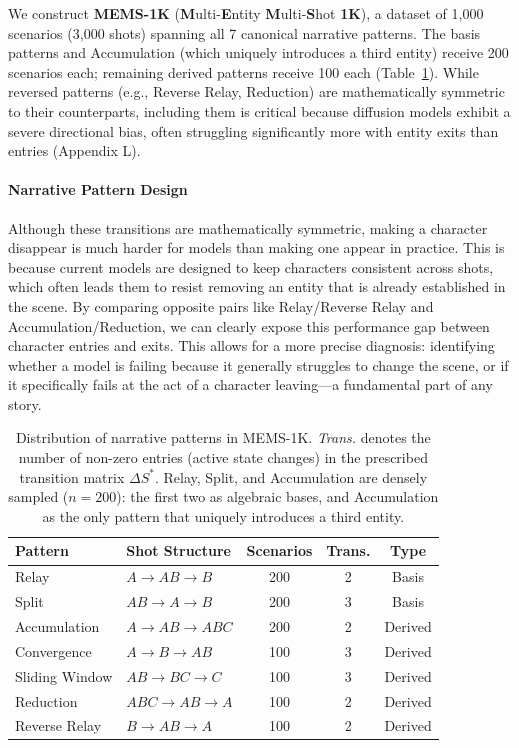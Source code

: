 \documentclass[sigconf,review,anonymous]{acmart}
\theoremstyle{definition}
\begin{document}
We construct \textbf{MEMS-1K} (\textbf{M}ulti-\textbf{E}ntity \textbf{M}ulti-\textbf{S}hot \textbf{1K}), a dataset of 1{,}000 scenarios (3{,}000 shots) spanning all 7 canonical narrative patterns. The basis patterns and Accumulation (which uniquely introduces a third entity) receive 200 scenarios each; remaining derived patterns receive 100 each (Table~\ref{tab:pattern_dist}). While reversed patterns (e.g., Reverse Relay, Reduction) are mathematically symmetric to their counterparts, including them is critical because diffusion models exhibit a severe directional bias, often struggling significantly more with entity exits than entries (Appendix L).
\paragraph{Narrative Pattern Design}
Although these transitions are mathematically symmetric, making a character disappear is much harder for models than making one appear in practice. This is because current models are designed to keep characters consistent across shots, which often leads them to resist removing an entity that is already established in the scene. By comparing opposite pairs like Relay/Reverse Relay and Accumulation/Reduction, we can clearly expose this performance gap between character entries and exits. This allows for a more precise diagnosis: identifying whether a model is failing because it generally struggles to change the scene, or if it specifically fails at the act of a character leaving—a fundamental part of any story.

\begin{table}[t]
\caption{Distribution of narrative patterns in MEMS-1K. \emph{Trans.} denotes the number of non-zero entries (active state changes) in the prescribed transition matrix $\Delta S^*$. Relay, Split, and Accumulation are densely sampled ($n\!=\!200$): the first two as algebraic bases, and Accumulation as the only pattern that uniquely introduces a third entity.}
\label{tab:pattern_dist}
\centering
\small
\setlength{\tabcolsep}{5pt}
\begin{tabular}{@{}llccc@{}}
\toprule
Pattern & Shot Structure & Scenarios & Trans. & Type \\
\midrule
Relay & $A \to AB \to B$ & 200 & 2 & Basis \\
Split & $AB \to A \to B$ & 200 & 3 & Basis \\
Accumulation & $A \to AB \to ABC$ & 200 & 2 & Derived \\
Convergence & $A \to B \to AB$ & 100 & 3 & Derived \\
Sliding Window & $AB \to BC \to C$ & 100 & 3 & Derived \\
Reduction & $ABC \to AB \to A$ & 100 & 2 & Derived \\
Reverse Relay & $B \to AB \to A$ & 100 & 2 & Derived \\
\bottomrule
\end{tabular}
\end{table}
\end{document}
